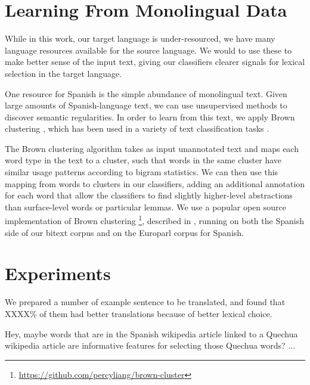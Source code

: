 \documentclass[10pt, a4paper]{article}
\begin{document}
\section{Learning From Monolingual Data}
While in this work, our target language is under-resourced, we have many
language resources available for the source language. We would to use these to
make better sense of the input text, giving our classifiers clearer signals for
lexical selection in the target language.

One resource for Spanish is the simple abundance of monolingual text. Given
large amounts of Spanish-language text, we can use unsupervised methods to
discover semantic regularities. In order to learn from this text, we apply
Brown clustering \cite{Brown92class-basedn-gram}, which has been used in a
variety of text classification tasks \cite{turian-ratinov-bengio:2010:ACL}.

The Brown clustering algorithm takes as input unannotated text and maps each
word type in the text to a cluster, such that words in the same cluster have
similar usage patterns according to bigram statistics. We can then use this
mapping from words to clusters in our classifiers, adding an additional
annotation for each word that allow the classifiers to find slightly
higher-level abstractions than surface-level words or particular lemmas.
We use a popular open source implementation of Brown clustering
\footnote{\url{https://github.com/percyliang/brown-cluster}}, described in
\cite{Liang05semi-supervisedlearning}, running on both the Spanish side of our
bitext corpus and on the Europarl corpus for Spanish.

\section{Experiments}
We prepared a number of example sentence to be translated, and found that
XXXX\% of them had better translations because of better lexical choice.

Hey, maybe words that are in the Spanish wikipedia article linked to a Quechua
wikipedia article are informative features for selecting those Quechua words?
...
\end{document}
